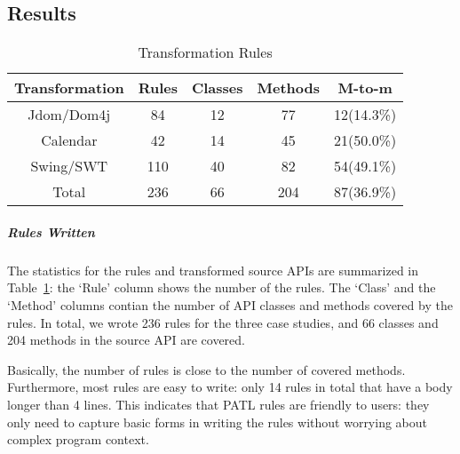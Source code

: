 \documentclass[a4paper, USenglish]{lipics-v2016}
\newcommand{\PATL}{PATL\xspace}
\theoremstyle{plain}
\begin{document}
\subsection{Results}

\begin{table}
  \centering
  \caption{Transformation Rules}
  \label{tbl:rules}
  \footnotesize
  \begin{tabular}{|c|c|c|c|c|}
    \hline
    Transformation & Rules & Classes & Methods & M-to-m\\
    \hline \hline
    Jdom/Dom4j & 84 & 12 & 77  & 12(14.3\%) \\
    \hline
    Calendar & 42 & 14 & 45 & 21(50.0\%) \\
    \hline
    Swing/SWT & 110 & 40 & 82 & 54(49.1\%) \\
    \hline
    \hline
    Total & 236 & 66 & 204 & 87(36.9\%) \\ 
    \hline
  \end{tabular}
\end{table}

\subparagraph*{Rules Written}
The statistics for the rules and transformed source APIs are
summarized in Table~\ref{tbl:rules}: the `Rule' column shows the
number of the rules. The `Class' and the `Method' columns contian the number of
API classes and methods covered by the rules. In total, we wrote 236
rules for the three case studies, and 66 classes and
204 methods in the source API are covered.

Basically, the number of rules is close to the number of covered methods. Furthermore, most rules are easy to write: only
14 rules in total that have a body longer than 4 lines. This indicates that \PATL rules are friendly to users: they only need to capture basic forms in writing the rules without worrying about complex program context.
\end{document}
